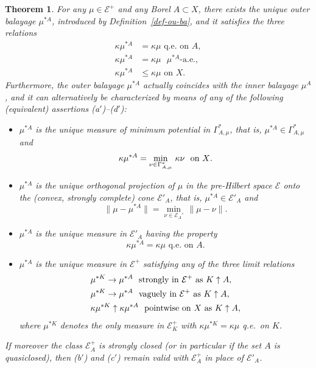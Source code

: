 \documentclass[12pt,a4paper,reqno]{amsart} %
\theoremstyle{lause}
\theoremstyle{maaritelma}
\theoremstyle{lause}
\newtheorem{theorem}{Theorem}[section]
\theoremstyle{maaritelma}
\numberwithin{equation}{section}
\begin{document}
\begin{theorem}\label{th-bal-ou}
  For any\/ $\mu\in\mathcal E^+$ and any Borel\/ $A\subset X$, there exists the unique outer balayage\/ $\mu^{*A}$, introduced by Definition\/~{\rm\ref{def-ou-ba}}, and it satisfies the three relations  \begin{align*}
\kappa\mu^{*A}&=\kappa\mu\text{ \ q.e.\ on\ }A,\\
\kappa\mu^{*A}&=\kappa\mu\text{ \ $\mu^{*A}$-a.e.,}\\
\kappa\mu^{*A}&\leqslant\kappa\mu\text{ \ on $X$.}
\end{align*}
Furthermore, the outer balayage\/ $\mu^{*A}$ actually coincides with the inner balayage\/ $\mu^A$,
and it can alternatively be characterized by means of any of the following\/ {\rm(}equivalent\/{\rm)} assertions\/ {\rm(a$'$)--(d$'$)}:
\begin{itemize}
\item[\rm(a$'$)] $\mu^{*A}$ is the unique measure of minimum potential in\/ $\Gamma_{A,\mu}^*$, that is, $\mu^{*A}\in\Gamma_{A,\mu}^*$ and
\[\kappa\mu^{*A}=\min_{\nu\in\Gamma_{A,\mu}^*}\,\kappa\nu\text{ \ on\/ $X$}.\]
\item[\rm(b$'$)] $\mu^{*A}$ is the unique orthogonal projection of\/ $\mu$ in the pre-Hilbert space\/ $\mathcal E$ onto the\/ {\rm(}convex, strongly complete\/{\rm)} cone $\mathcal E'_A$, that is, $\mu^{*A}\in\mathcal E'_A$ and
\[\|\mu-\mu^{*A}\|=\min_{\nu\in\mathcal E_A'}\,\|\mu-\nu\|.\]
\item[\rm(c$'$)] $\mu^{*A}$ is the unique measure in\/ $\mathcal E'_A$ having the property
\[\kappa\mu^{*A}=\kappa\mu\text{ \ q.e.\ on\ }A.\]
\item[\rm(d$'$)] $\mu^{*A}$ is the unique measure in\/ $\mathcal E^+$ satisfying any of the three limit relations
\begin{align*}
 &\mu^{*K}\to\mu^{*A}\text{ \ strongly in\/ $\mathcal E^+$ as\/ $K\uparrow A$},\\
 &\mu^{*K}\to\mu^{*A}\text{ \ vaguely in\/ $\mathcal E^+$ as\/ $K\uparrow A$},\\
 &\kappa\mu^{*K}\uparrow\kappa\mu^{*A}\text{ \ pointwise on\/ $X$ as\/ $K\uparrow A$},
\end{align*}
where\/ $\mu^{*K}$ denotes the only measure in\/ $\mathcal E^+_K$ with\/ $\kappa\mu^{*K}=\kappa\mu$ q.e.\ on\/ $K$.
\end{itemize}
If moreover the class\/ $\mathcal E^+_A$ is strongly closed\/ {\rm(}or in particular if the set\/ $A$ is quasiclosed\/{\rm)}, then\/ {\rm(b$'$)} and\/ {\rm(c$'$)} remain valid with\/ $\mathcal E^+_A$ in place of\/ $\mathcal E'_A$.
\end{theorem}
\end{document}
